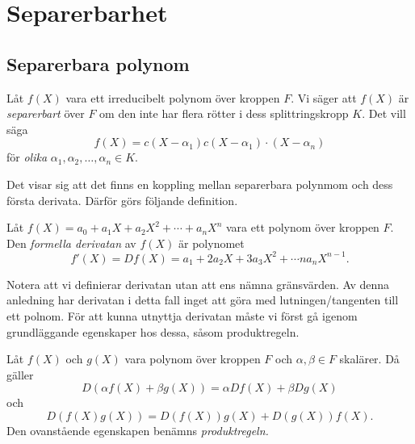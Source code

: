 \documentclass{article}
\theoremstyle{definition}
\begin{document}
\section{Separerbarhet}
\subsection{Separerbara polynom}
\begin{mydef}{}{}
  Låt $f(X)$ vara ett irreducibelt polynom över kroppen $F$. Vi säger att $f(X)$ är \textit{separerbart} över $F$ om den inte har flera 
  rötter i dess splittringskropp $K$. Det vill säga 
  \[f(X) = c(X-\alpha_1)c(X-\alpha_1)\cdot (X-\alpha_n)\]
  för \textit{olika} $\alpha_1, \alpha_2, \ldots, \alpha_n \in K.$
\end{mydef}
Det visar sig att det finns en koppling mellan separerbara polynmom och dess första derivata. Därför görs följande definition. 
\begin{mydef}{}{}
  Låt $f(X) = a_0 + a_1X + a_2X^2 + \cdots + a_nX^n$ vara ett polynom över kroppen $F$. Den \textit{formella derivatan} av $f(X)$ är polynomet 
  \[f'(X) = Df(X) = a_1 + 2a_2X + 3a_3X^2 + \cdots na_nX^{n-1}.\]
\end{mydef}
Notera att vi definierar derivatan utan att ens nämna gränsvärden. Av denna anledning har derivatan i detta fall inget att göra med lutningen/tangenten 
till ett polnom. För att kunna utnyttja derivatan måste vi först gå igenom grundläggande egenskaper hos dessa, såsom produktregeln. 

\begin{mylemma}{}{}
  Låt $f(X)$ och $g(X)$ vara polynom över kroppen $F$ och $\alpha, \beta \in F$ skalärer. Då gäller 
  \[ D(\alpha f(X) + \beta g(X))  = \alpha Df(X) + \beta D g(X) \]
  och
  \[ D(f(X)g(X)) = D(f(X))g(X) + D(g(X)) f(X).\]
  Den ovanstående egenskapen benämns \textit{produktregeln.}
\end{mylemma}
\end{document}
